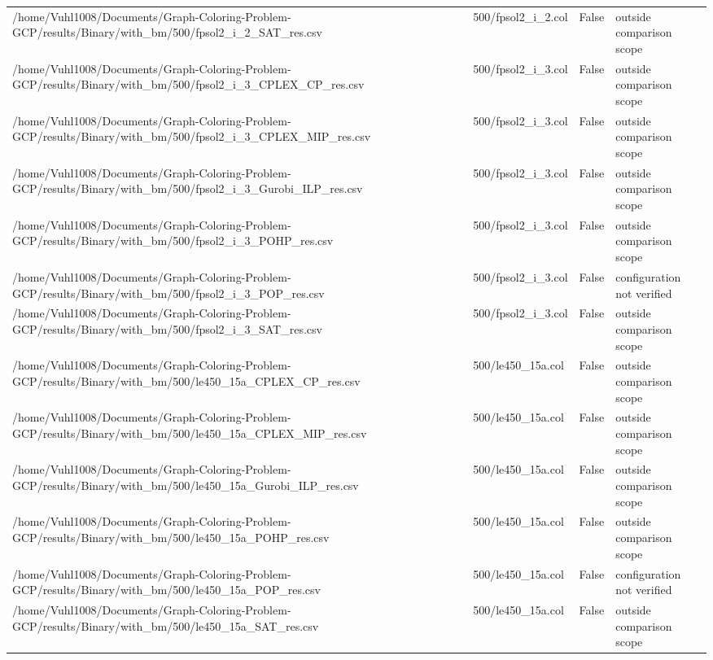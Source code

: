 \begin{table}[htbp]
\begin{tabular}{llll}
/home/Vuhl1008/Documents/Graph-Coloring-Problem-GCP/results/Binary/with\_bm/500/fpsol2\_i\_2\_SAT\_res.csv & 500/fpsol2\_i\_2.col & False & outside comparison scope \\
/home/Vuhl1008/Documents/Graph-Coloring-Problem-GCP/results/Binary/with\_bm/500/fpsol2\_i\_3\_CPLEX\_CP\_res.csv & 500/fpsol2\_i\_3.col & False & outside comparison scope \\
/home/Vuhl1008/Documents/Graph-Coloring-Problem-GCP/results/Binary/with\_bm/500/fpsol2\_i\_3\_CPLEX\_MIP\_res.csv & 500/fpsol2\_i\_3.col & False & outside comparison scope \\
/home/Vuhl1008/Documents/Graph-Coloring-Problem-GCP/results/Binary/with\_bm/500/fpsol2\_i\_3\_Gurobi\_ILP\_res.csv & 500/fpsol2\_i\_3.col & False & outside comparison scope \\
/home/Vuhl1008/Documents/Graph-Coloring-Problem-GCP/results/Binary/with\_bm/500/fpsol2\_i\_3\_POHP\_res.csv & 500/fpsol2\_i\_3.col & False & outside comparison scope \\
/home/Vuhl1008/Documents/Graph-Coloring-Problem-GCP/results/Binary/with\_bm/500/fpsol2\_i\_3\_POP\_res.csv & 500/fpsol2\_i\_3.col & False & configuration not verified \\
/home/Vuhl1008/Documents/Graph-Coloring-Problem-GCP/results/Binary/with\_bm/500/fpsol2\_i\_3\_SAT\_res.csv & 500/fpsol2\_i\_3.col & False & outside comparison scope \\
/home/Vuhl1008/Documents/Graph-Coloring-Problem-GCP/results/Binary/with\_bm/500/le450\_15a\_CPLEX\_CP\_res.csv & 500/le450\_15a.col & False & outside comparison scope \\
/home/Vuhl1008/Documents/Graph-Coloring-Problem-GCP/results/Binary/with\_bm/500/le450\_15a\_CPLEX\_MIP\_res.csv & 500/le450\_15a.col & False & outside comparison scope \\
/home/Vuhl1008/Documents/Graph-Coloring-Problem-GCP/results/Binary/with\_bm/500/le450\_15a\_Gurobi\_ILP\_res.csv & 500/le450\_15a.col & False & outside comparison scope \\
/home/Vuhl1008/Documents/Graph-Coloring-Problem-GCP/results/Binary/with\_bm/500/le450\_15a\_POHP\_res.csv & 500/le450\_15a.col & False & outside comparison scope \\
/home/Vuhl1008/Documents/Graph-Coloring-Problem-GCP/results/Binary/with\_bm/500/le450\_15a\_POP\_res.csv & 500/le450\_15a.col & False & configuration not verified \\
/home/Vuhl1008/Documents/Graph-Coloring-Problem-GCP/results/Binary/with\_bm/500/le450\_15a\_SAT\_res.csv & 500/le450\_15a.col & False & outside comparison scope \\

\end{tabular}
\end{table}
